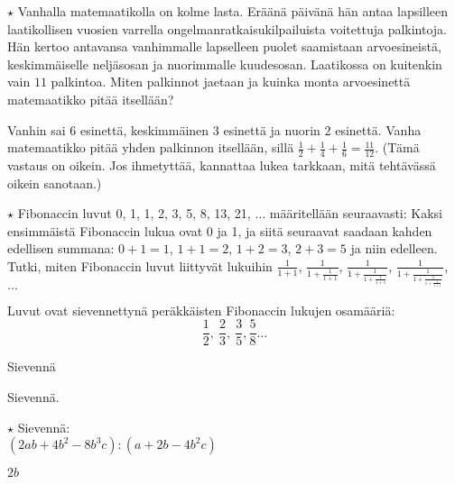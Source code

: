 \begin{tehtavasivu}
\begin{tehtava}
	$\star$ Vanhalla matemaatikolla on kolme lasta. Eräänä päivänä hän antaa lapsilleen laatikollisen vuosien varrella ongelmanratkaisukilpailuista voitettuja palkintoja. Hän kertoo antavansa vanhimmalle lapselleen puolet saamistaan arvoesineistä, keskimmäiselle neljäsosan ja nuorimmalle kuudesosan. Laatikossa on kuitenkin vain $11$ palkintoa. Miten  palkinnot jaetaan ja kuinka monta arvoesinettä matemaatikko pitää itsellään?
	\begin{vastaus}
		Vanhin sai $6$ esinettä, keskimmäinen $3$ esinettä ja nuorin $2$ esinettä. Vanha
		matemaatikko pitää yhden palkinnon itsellään, sillä $\frac{1}{2} + \frac{1}{4}
		+ \frac{1}{6} = \frac{11}{12}$. (Tämä vastaus on oikein. Jos ihmetyttää, kannattaa lukea tarkkaan, mitä tehtävässä oikein sanotaan.)
	\end{vastaus}
\end{tehtava}

\begin{tehtava}
	$\star$ Fibonaccin luvut 0, 1, 1, 2, 3, 5, 8, 13, 21, $\ldots$ määritellään seuraavasti: Kaksi ensimmäistä
	Fibonaccin lukua ovat 0 ja 1, ja siitä seuraavat saadaan kahden
	edellisen summana: $0+1=1$, $1+1=2$, $1+2 = 3$, $2+3=5 $
	ja niin edelleen. 
	Tutki, miten Fibonaccin luvut liittyvät lukuihin
	$ \frac{1}{1+1}$, $\frac{1}{1+\frac{1}{1+1}}$, 
	$\frac{1}{1+\frac{1}{1+\frac{1}{1+1}}}$, 
	$\frac{1}{1+\frac{1}{1+\frac{1}{1+\frac{1}{1+1}}}}$, $\ldots\ $
	\begin{vastaus}
		Luvut ovat sievennettynä peräkkäisten Fibonaccin
		lukujen osamääriä:
		\[\frac{1}{2}, \ \frac{2}{3}, \ \frac{3}{5}, \frac{5}{8} \ldots  \]
	\end{vastaus}
\end{tehtava}

\begin{tehtava}
Sievennä

\begin{vastaus}
\end{vastaus}
\end{tehtava}

\begin{tehtava}
Sievennä.

\begin{vastaus}
\end{vastaus}
\end{tehtava}


\begin{tehtava} $\star$
Sievennä: \\
$(2ab+4b^2-8b^3c):(a+2b-4b^2c)$
	\begin{vastaus}
	$2b$
	\end{vastaus}
\end{tehtava}

\end{tehtavasivu}